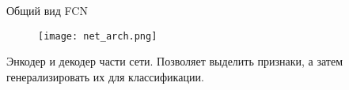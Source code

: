 
\begin{frame}{Общий вид FCN}
\begin{figure}
\centering
\texttt{[image: net\_arch.png]}
\end{figure}
    Энкодер и декодер части сети.
    Позволяет выделить признаки, а затем генерализировать их для классификации.
\end{frame}